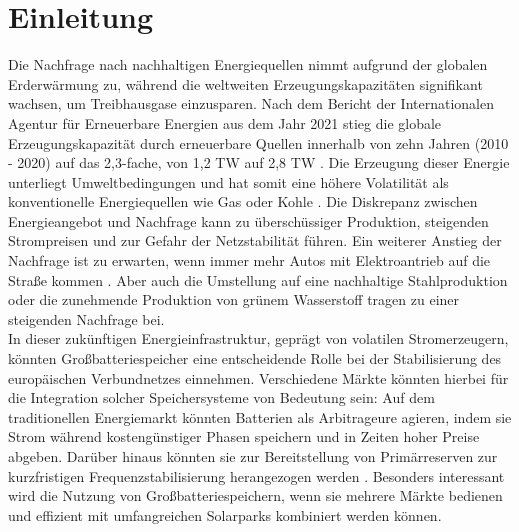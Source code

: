 \documentclass[a4paper, 11pt]{article}
\begin{document}
\section{Einleitung}%
\label{introduction}
Die Nachfrage nach nachhaltigen Energiequellen nimmt aufgrund der globalen Erderwärmung zu, während die weltweiten Erzeugungskapazitäten signifikant wachsen, um Treibhausgase einzusparen. Nach dem Bericht der Internationalen Agentur für Erneuerbare Energien aus dem Jahr 2021 stieg die globale Erzeugungskapazität durch erneuerbare Quellen innerhalb von zehn Jahren (2010 - 2020) auf das 2,3-fache, von 1,2 TW auf 2,8 TW \cite{noauthor_renewable_nodate}. Die Erzeugung dieser Energie unterliegt Umweltbedingungen und hat somit eine höhere Volatilität als konventionelle Energiequellen wie Gas oder Kohle \cite{leonard_substitution_2018}. Die Diskrepanz zwischen Energieangebot und Nachfrage kann zu überschüssiger Produktion, steigenden Strompreisen und zur Gefahr der Netzstabilität führen.
Ein weiterer Anstieg der Nachfrage ist zu erwarten, wenn immer mehr Autos mit Elektroantrieb auf die Straße kommen \cite{noauthor_global_nodate}. Aber auch die Umstellung auf eine nachhaltige Stahlproduktion oder die zunehmende Produktion von grünem Wasserstoff tragen zu einer steigenden Nachfrage bei. \\
In dieser zukünftigen Energieinfrastruktur, geprägt von volatilen Stromerzeugern, könnten Großbatteriespeicher eine entscheidende Rolle bei der Stabilisierung des europäischen Verbundnetzes einnehmen. Verschiedene Märkte könnten hierbei für die Integration solcher Speichersysteme von Bedeutung sein: Auf dem traditionellen Energiemarkt könnten Batterien als Arbitrageure agieren, indem sie Strom während kostengünstiger Phasen speichern und in Zeiten hoher Preise abgeben. Darüber hinaus könnten sie zur Bereitstellung von Primärreserven zur kurzfristigen Frequenzstabilisierung herangezogen werden \cite{wu_optimal_2022}. Besonders interessant wird die Nutzung von Großbatteriespeichern, wenn sie mehrere Märkte bedienen und effizient mit umfangreichen Solarparks kombiniert werden können. 
\end{document}
